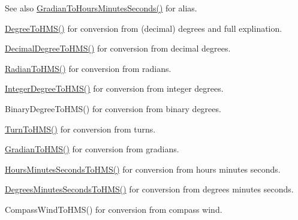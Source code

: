 \begin{DoxySeeAlso}{See also}
\mbox{\hyperlink{group___e_g_x_math-_conversions-_angle_conversions-_gradian_gaf174cf5b716d5a490b3744ffe9ff3b97}{Gradian\+To\+Hours\+Minutes\+Seconds()}} for alias. 

\mbox{\hyperlink{group___e_g_x_math-_conversions-_angle_conversions-_degree_ga0bb223ca6e77b00439a6d910ab32d82e}{Degree\+To\+H\+M\+S()}} for conversion from (decimal) degrees and full explination. 

\mbox{\hyperlink{group___e_g_x_math-_conversions-_angle_conversions-_decimal_degree_ga981b48f16766590641360ca98dfa7b8c}{Decimal\+Degree\+To\+H\+M\+S()}} for conversion from decimal degrees. 

\mbox{\hyperlink{group___e_g_x_math-_conversions-_angle_conversions-_radian_ga55b5fba9307f34ab8db57391789a90cc}{Radian\+To\+H\+M\+S()}} for conversion from radians. 

\mbox{\hyperlink{group___e_g_x_math-_conversions-_angle_conversions-_integer_degree_gae6b79bd5a92f8c6942b9fc2c50695e6a}{Integer\+Degree\+To\+H\+M\+S()}} for conversion from integer degrees. 

Binary\+Degree\+To\+H\+M\+S() for conversion from binary degrees. 

\mbox{\hyperlink{group___e_g_x_math-_conversions-_angle_conversions-_turn_ga74efaece2f95aa6671f18382e5f3925f}{Turn\+To\+H\+M\+S()}} for conversion from turns. 

\mbox{\hyperlink{group___e_g_x_math-_conversions-_angle_conversions-_gradian_ga6513a992679fbb97d2969cf8bd68306f}{Gradian\+To\+H\+M\+S()}} for conversion from gradians. 

\mbox{\hyperlink{group___e_g_x_math-_conversions-_angle_conversions-_hours_minutes_seconds_ga5ac65e4e7ed8857151b3f81f5928df3a}{Hours\+Minutes\+Seconds\+To\+H\+M\+S()}} for conversion from hours minutes seconds. 

\mbox{\hyperlink{group___e_g_x_math-_conversions-_angle_conversions-_degrees_minutes_seconds_ga63c1cd3c9048d0c5a80fd9bc851c38ac}{Degrees\+Minutes\+Seconds\+To\+H\+M\+S()}} for conversion from degrees minutes seconds. 

Compass\+Wind\+To\+H\+M\+S() for conversion from compass wind. 
\end{DoxySeeAlso}
\mbox{\label{group___e_g_x_math-_conversions-_angle_conversions-_gradian_gaf174cf5b716d5a490b3744ffe9ff3b97}} 
